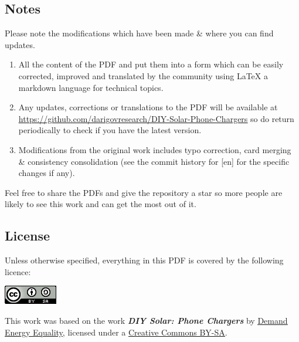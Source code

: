 \documentclass{article}
\theoremstyle{definition}
\theoremstyle{definition}
\theoremstyle{remark}
\begin{document}

  {\color{blue}\subsection*{Notes}} %
  \label{sub:notes}

    Please note the modifications which have been made \& where you can find updates.

    \begin{enumerate}
      \item All the content of the PDF and put them into a form which can be easily corrected, improved and translated by the community using LaTeX a markdown language for technical topics.
      \item Any updates, corrections or translations to the PDF will be available at \href{https://github.com/darigovresearch/DIY-Solar-Phone-Chargers}{\underline{https://github.com/darigovresearch/DIY-Solar-Phone-Chargers}} so do return periodically to check if you have the latest version.
      \item Modifications from the original work includes typo correction, card merging \& consistency consolidation (see the commit history for [en] for the specific changes if any).
    \end{enumerate}

    Feel free to share the PDFs and give the repository a star so more people are likely to see this work and can get the most out of it.


  {\color{blue}\subsection*{License}} %
  \label{sub:license}

    Unless otherwise specified, everything in this PDF is covered by the following licence:

    \includegraphics[]{../Images/image_0_2_(license).png} \newline

    This work was based on the work \textbf{\textit{DIY Solar: Phone Chargers}} by \href{https://www.demandenergyequality.org/}{\underline{Demand Energy Equality}}, licensed under a \href{https://creativecommons.org/licenses/by-sa/4.0/legalcode}{\underline{Creative Commons BY-SA}}.
\end{document}
